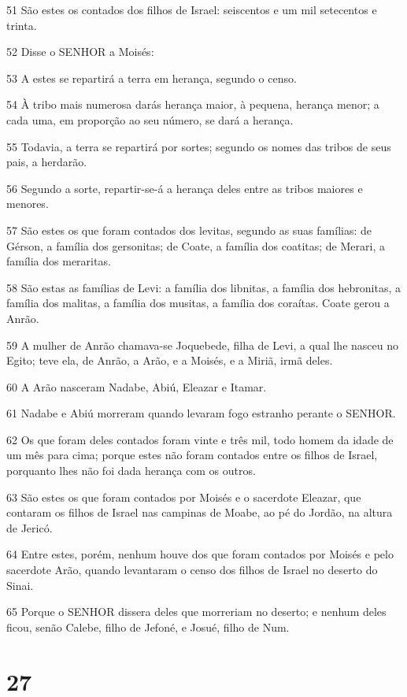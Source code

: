 \par 51 São estes os contados dos filhos de Israel: seiscentos e um mil setecentos e trinta.
\par 52 Disse o SENHOR a Moisés:
\par 53 A estes se repartirá a terra em herança, segundo o censo.
\par 54 À tribo mais numerosa darás herança maior, à pequena, herança menor; a cada uma, em proporção ao seu número, se dará a herança.
\par 55 Todavia, a terra se repartirá por sortes; segundo os nomes das tribos de seus pais, a herdarão.
\par 56 Segundo a sorte, repartir-se-á a herança deles entre as tribos maiores e menores.
\par 57 São estes os que foram contados dos levitas, segundo as suas famílias: de Gérson, a família dos gersonitas; de Coate, a família dos coatitas; de Merari, a família dos meraritas.
\par 58 São estas as famílias de Levi: a família dos libnitas, a família dos hebronitas, a família dos malitas, a família dos musitas, a família dos coraítas. Coate gerou a Anrão.
\par 59 A mulher de Anrão chamava-se Joquebede, filha de Levi, a qual lhe nasceu no Egito; teve ela, de Anrão, a Arão, e a Moisés, e a Miriã, irmã deles.
\par 60 A Arão nasceram Nadabe, Abiú, Eleazar e Itamar.
\par 61 Nadabe e Abiú morreram quando levaram fogo estranho perante o SENHOR.
\par 62 Os que foram deles contados foram vinte e três mil, todo homem da idade de um mês para cima; porque estes não foram contados entre os filhos de Israel, porquanto lhes não foi dada herança com os outros.
\par 63 São estes os que foram contados por Moisés e o sacerdote Eleazar, que contaram os filhos de Israel nas campinas de Moabe, ao pé do Jordão, na altura de Jericó.
\par 64 Entre estes, porém, nenhum houve dos que foram contados por Moisés e pelo sacerdote Arão, quando levantaram o censo dos filhos de Israel no deserto do Sinai.
\par 65 Porque o SENHOR dissera deles que morreriam no deserto; e nenhum deles ficou, senão Calebe, filho de Jefoné, e Josué, filho de Num.

\chapter{27}


